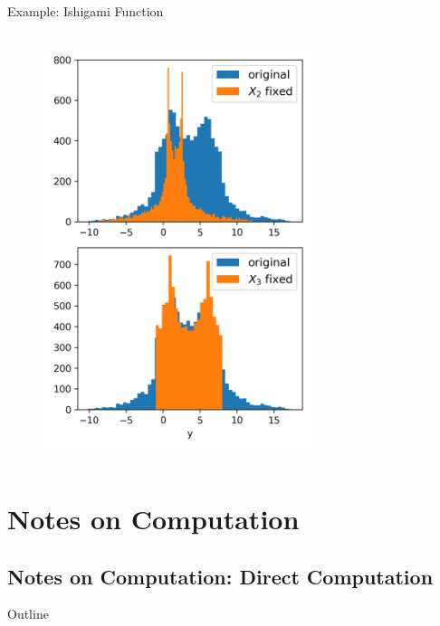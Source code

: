 \documentclass[english,aspectratio=169]{beamer}
\begin{document}
\begin{frame}[fragile]{Example: Ishigami Function}
\begin{columns}[T,onlytextwidth]
\begin{column}{0.4\textwidth}
  \begin{figure}
    \centering
    \includegraphics[width=0.7\textwidth]{./figures/ishigami.png}
  \end{figure}
\end{column}

\end{columns}

\end{frame}

\section{Notes on Computation}

\subsection{Notes on Computation: Direct Computation}

\begin{frame}{Outline}
  \tableofcontents[currentsubsection]
\end{frame}
\end{document}
